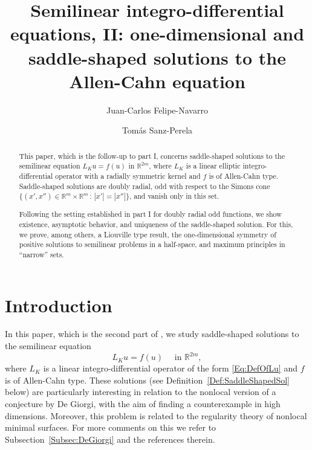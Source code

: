 \documentclass[12pt,reqno]{amsart}
\title[Semilinear integro-differential equations II]{Semilinear integro-differential equations, II: one-dimensional and saddle-shaped solutions to the Allen-Cahn equation}
\author{Juan-Carlos Felipe-Navarro}
\author{Tomás Sanz-Perela}
\theoremstyle{definition}
\theoremstyle{remark}
\newcommand{\con}[1]{\mathbb{#1}}
\newcommand{\R}{\con{R}} %
\numberwithin{equation}{section}
\begin{document}
\begin{abstract}
This paper, which is the follow-up to part I, concerns saddle-shaped solutions to the semilinear equation $L_K u = f(u)$ in $\R^{2m}$, where $L_K$ is a linear elliptic integro-differential operator with a radially symmetric kernel and $f$ is of Allen-Cahn type. Saddle-shaped solutions are doubly radial, odd with respect to the Simons cone $\{(x', x'') \in \R^m \times \R^m \, : \, |x'| = |x''|\}$, and vanish only in this set.

Following the setting established in part I for doubly radial odd functions, we show existence, asymptotic behavior, and uniqueness of the saddle-shaped solution. For this, we prove, among others, a Liouville type result, the one-dimensional symmetry of positive solutions to semilinear problems in a half-space, and maximum principles in ``narrow'' sets.
\end{abstract}


\maketitle


\tableofcontents

\section{Introduction}
\label{Sec:Introduction}

In this paper, which is the second part of \cite{FelipeSanz-Perela:IntegroDifferentialI}, we study saddle-shaped solutions to the semilinear equation
\begin{equation}
\label{Eq:NonlocalAllenCahn}
L_K u = f(u) \quad \textrm{ in } \R^{2m},
\end{equation}
where $L_K$ is a linear integro-differential operator of the form \eqref{Eq:DefOfLu} and $f$ is of Allen-Cahn type. These  solutions (see Definition~\ref{Def:SaddleShapedSol} below) are particularly interesting in relation to the nonlocal version of a conjecture by De Giorgi, with the aim of finding a counterexample in high dimensions. Moreover, this problem is related to the regularity theory of nonlocal minimal surfaces. For more comments on this we refer to Subsection~\ref{Subsec:DeGiorgi} and the references therein.
\end{document}
